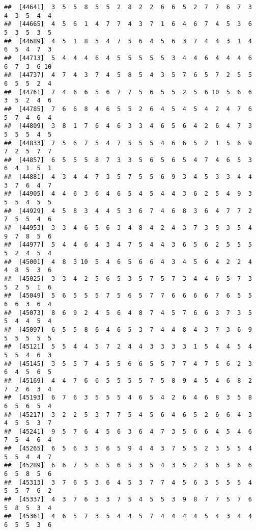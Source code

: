 \documentclass[
]{book}
\begin{document}
\begin{verbatim}
##  [44641]  3  5  5  8  5  5  2  8  2  2  6  6  5  2  7  7  6  7  3  4  3  5  4  4
##  [44665]  4  5  6  1  4  7  7  4  3  7  1  6  4  6  7  4  5  3  6  5  3  5  3  5
##  [44689]  4  5  1  8  5  4  7  5  6  4  5  6  3  7  4  4  3  1  4  6  5  4  7  3
##  [44713]  5  4  4  4  6  4  5  5  5  5  5  3  4  4  6  4  4  4  6  6  7  3  6 10
##  [44737]  4  7  4  3  7  4  5  8  5  4  3  5  7  6  5  7  2  5  5  6  5  5  2  4
##  [44761]  7  4  6  6  5  6  7  7  5  6  5  5  2  5  6 10  5  6  6  3  5  2  4  6
##  [44785]  7  6  6  8  4  6  5  5  2  6  4  5  4  5  4  2  4  7  6  5  7  4  6  4
##  [44809]  3  8  1  7  6  4  6  3  3  4  6  5  6  4  2  6  4  7  3  5  5  5  4  5
##  [44833]  7  5  6  7  5  4  7  5  5  5  4  6  6  5  2  1  5  6  9  7  2  5  7  7
##  [44857]  6  5  5  5  8  7  3  3  5  6  5  6  5  4  7  4  6  5  3  6  4  1  5  1
##  [44881]  4  3  4  4  7  3  5  7  5  5  6  9  3  4  5  3  3  4  4  3  7  6  4  7
##  [44905]  4  4  6  3  6  4  6  5  4  5  4  4  3  6  2  5  4  9  3  5  5  4  5  5
##  [44929]  4  5  8  3  4  4  5  3  6  7  4  6  8  3  6  4  7  7  2  7  5  5  4  6
##  [44953]  3  3  4  6  5  6  3  4  8  4  2  4  3  7  3  5  3  5  4  9  7  8  5  6
##  [44977]  5  4  4  6  4  3  4  7  5  4  4  3  6  5  6  2  5  5  5  5  2  4  5  4
##  [45001]  4  8  3 10  5  4  6  5  6  6  4  3  4  5  6  4  2  2  4  4  8  5  3  6
##  [45025]  3  3  4  2  5  6  5  3  5  7  5  7  3  4  4  6  5  7  3  5  2  5  1  6
##  [45049]  5  6  5  5  5  7  5  6  5  7  7  6  6  6  6  7  6  5  5  6  6  3  6  4
##  [45073]  8  6  9  2  4  5  6  4  8  7  4  5  7  6  6  3  7  3  5  5  4  4  5  4
##  [45097]  6  5  5  8  6  4  6  5  3  7  4  4  8  4  3  7  3  6  9  5  5  5  5  5
##  [45121]  5  5  4  4  5  7  2  4  4  3  3  3  3  1  5  4  4  5  4  5  5  4  6  3
##  [45145]  3  5  5  7  4  5  5  6  6  5  5  7  7  4  7  5  6  2  3  6  4  5  6  5
##  [45169]  4  4  7  6  6  5  5  5  5  7  5  8  9  4  5  4  6  8  2  7  2  6  3  4
##  [45193]  6  7  6  3  5  5  5  4  6  5  4  2  6  4  6  8  3  5  8  6  5  6  5  4
##  [45217]  3  2  2  5  3  7  7  5  4  5  6  4  6  5  2  6  6  4  3  4  5  5  3  7
##  [45241]  9  5  7  6  4  5  6  3  6  4  7  3  5  6  6  4  5  4  6  7  5  4  6  4
##  [45265]  6  5  6  3  5  6  5  9  4  4  3  7  5  5  2  3  5  5  4  5  5  4  4  7
##  [45289]  6  6  7  5  6  5  6  5  3  5  4  3  5  2  3  6  3  6  6  6  5  8  5  6
##  [45313]  3  7  6  5  3  6  4  5  3  7  7  4  5  6  3  5  5  5  4  5  5  7  6  2
##  [45337]  4  3  7  6  3  3  7  5  4  5  5  3  9  8  7  7  5  7  6  5  8  5  3  4
##  [45361]  4  6  5  7  3  5  4  4  5  7  4  4  4  4  5  4  3  4  4  6  5  5  3  6

\end{verbatim}
\end{document}

